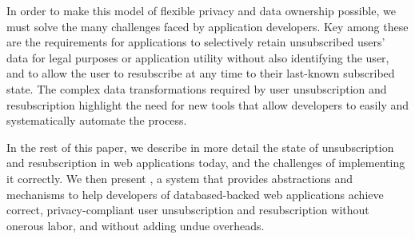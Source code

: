 In order to make this model of flexible privacy and data ownership possible, we must solve the many
challenges faced by application developers. Key among these are the requirements for applications to
selectively retain unsubscribed users' data for legal purposes or application utility without also
identifying the user, and to allow the user to resubscribe at any time to their last-known
subscribed state. The complex data transformations required by user unsubscription and
resubscription highlight the need for new tools that allow
developers to easily and systematically automate the process.

In the rest of this paper, we describe in more detail the state of unsubscription and resubscription in
web applications today, and the challenges of implementing it correctly.  We then present \sys, a
system that provides abstractions and mechanisms to help developers of databased-backed web
applications achieve correct, privacy-compliant user unsubscription and resubscription without
onerous labor, and without adding undue overheads.
